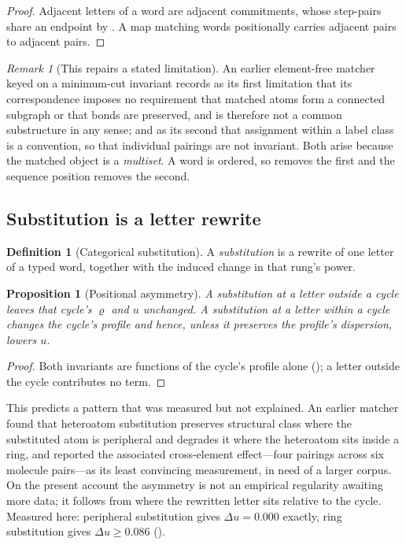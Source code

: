 \documentclass[11pt,a4paper]{article}
\theoremstyle{clthm}
\newtheorem{proposition}[theorem]{Proposition}
\theoremstyle{definition}
\newtheorem{definition}[theorem]{Definition}
\theoremstyle{remark}
\newtheorem{remark}[theorem]{Remark}
\newcommand{\circu}{\varrho}
\newcommand{\unif}{u}
\begin{document}
\begin{proof}
Adjacent letters of a word are adjacent commitments, whose step-pairs
share an endpoint by . A map matching words positionally
carries adjacent pairs to adjacent pairs.
\end{proof}

\begin{remark}[This repairs a stated limitation]
\label{rem:repairs}
An earlier element-free matcher keyed on a minimum-cut invariant records
as its first limitation that its correspondence imposes no requirement
that matched atoms form a connected subgraph or that bonds are preserved,
and is therefore not a common substructure in any sense; and as its second
that assignment within a label class is a convention, so that individual
pairings are not invariant. Both arise because the matched object is a
\emph{multiset}. A word is ordered, so  removes the
first and the sequence position removes the second.
\end{remark}

\subsection{Substitution is a letter rewrite}

\begin{definition}[Categorical substitution]
\label{def:subst}
A \emph{substitution} is a rewrite of one letter of a typed word, together
with the induced change in that rung's power.
\end{definition}

\begin{proposition}[Positional asymmetry]
\label{prop:positional}
A substitution at a letter outside a cycle leaves that cycle's $\circu$
and $\unif$ unchanged. A substitution at a letter within a cycle changes
the cycle's profile and hence, unless it preserves the profile's
dispersion, lowers $\unif$.
\end{proposition}

\begin{proof}
Both invariants are functions of the cycle's profile alone
(); a letter outside the cycle contributes no term.
\end{proof}

This predicts a pattern that was measured but not explained. An earlier
matcher found that heteroatom substitution preserves structural class
where the substituted atom is peripheral and degrades it where the
heteroatom sits inside a ring, and reported the associated cross-element
effect---four pairings across six molecule pairs---as its least convincing
measurement, in need of a larger corpus. On the present account the
asymmetry is not an empirical regularity awaiting more data; it follows
from where the rewritten letter sits relative to the cycle. Measured here:
peripheral substitution gives $\Delta\unif=0.000$ exactly, ring
substitution gives $\Delta\unif\ge0.086$ ().
\end{document}
